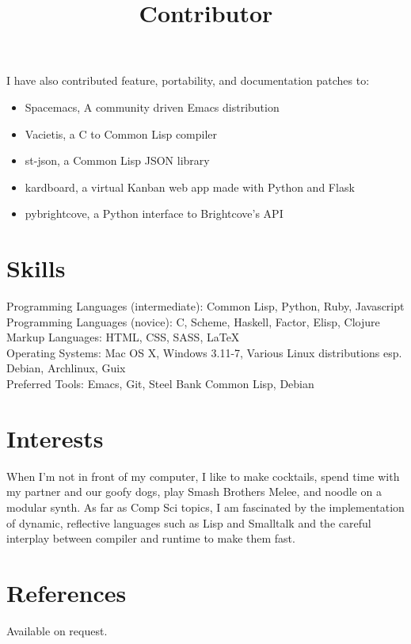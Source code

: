 \documentclass[margintitle,line]{res}
\begin{document}
\begin{resume}
\title{Contributor}
\dates{}
\begin{position}
  I have also contributed feature, portability, and documentation patches to:
  \begin{itemize}
    \item{Spacemacs, A community driven Emacs distribution}
    \item{Vacietis, a C to Common Lisp compiler}
    \item{st-json, a Common Lisp JSON library}
    \item{kardboard, a virtual Kanban web app made with Python and Flask}
    \item{pybrightcove, a Python interface to Brightcove's API}
  \end{itemize}
\end{position}


\section{Skills}

Programming Languages (intermediate): Common Lisp, Python, Ruby, Javascript \\
Programming Languages (novice): C, Scheme, Haskell, Factor, Elisp, Clojure \\
Markup Languages: HTML, CSS, SASS, LaTeX \\
Operating Systems: Mac OS X, Windows 3.11-7, Various Linux distributions
esp. Debian, Archlinux, Guix \\
Preferred Tools: Emacs, Git, Steel Bank Common Lisp, Debian \\


\section{Interests}

When I'm not in front of my computer, I like to make cocktails, spend
time with my partner and our goofy dogs, play Smash Brothers Melee,
and noodle on a modular synth. As far as Comp Sci topics, I am fascinated
by the implementation of dynamic, reflective languages such as Lisp and Smalltalk
and the careful interplay between compiler and runtime to make them fast.


\section{References}

Available on request.

\end{resume}
\end{document}
